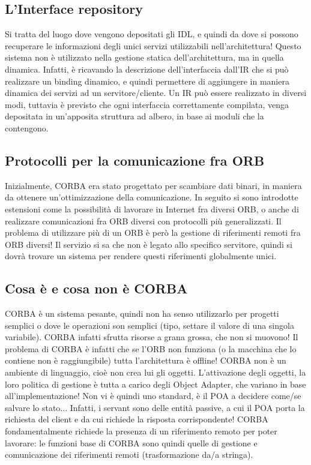 \subsection{L'Interface repository}
Si tratta del luogo dove vengono depositati gli IDL, e quindi da dove si possono recuperare le informazioni degli unici
servizi utilizzabili nell'architettura!
Questo sistema non è utilizzato nella gestione statica dell'architettura, ma in quella dinamica. Infatti, è ricavando
la descrizione dell'interfaccia dall'IR che si può realizzare un binding dinamico, e quindi permettere di aggiungere in maniera dinamica dei
servizi ad un servitore/cliente.
Un IR può essere realizzato in diversi modi, tuttavia è previsto che ogni interfaccia correttamente compilata, venga depositata in un'apposita struttura ad albero, in base ai moduli che la contengono.
\subsection{Protocolli per la comunicazione fra ORB}
Inizialmente, CORBA era stato progettato per scambiare dati binari, in maniera da ottenere un'ottimizzazione della
comunicazione. In seguito si sono introdotte estensioni come la possibilità di lavorare in Internet fra diversi ORB, o
anche di realizzare comunicazioni fra ORB diversi con protocolli più generalizzati.
Il problema di utilizzare più di un ORB è però la gestione di riferimenti remoti fra ORB diversi! Il servizio si sa
che non è legato allo specifico servitore, quindi si dovrà trovare un sistema per rendere questi riferimenti
globalmente unici.
\subsection{Cosa è e cosa non è CORBA}
CORBA è un sistema pesante, quindi non ha senso utilizzarlo per progetti semplici o dove le operazioni son semplici
(tipo, settare il valore di una singola variabile). CORBA infatti sfrutta risorse a grana grossa, che non si muovono!
Il problema di CORBA è infatti che se l'ORB non funziona (o la macchina che lo contiene non è raggiungibile) tutta
l'architettura è offline!
CORBA non è un ambiente di linguaggio, cioè non crea lui gli oggetti. L'attivazione degli oggetti, la loro politica di
gestione è tutta a carico degli Object Adapter, che variano in base all'implementazione! Non vi è quindi uno standard, è
il POA a decidere come/se salvare lo stato... Infatti, i servant sono delle entità passive, a cui il POA porta la
richiesta del client e da cui richiede la risposta corrispondente!
CORBA fondamentalmente richiede la presenza di un riferimento remoto per poter lavorare: le funzioni base di CORBA sono
quindi quelle di gestione e comunicazione dei riferimenti remoti (trasformazione da/a stringa).
